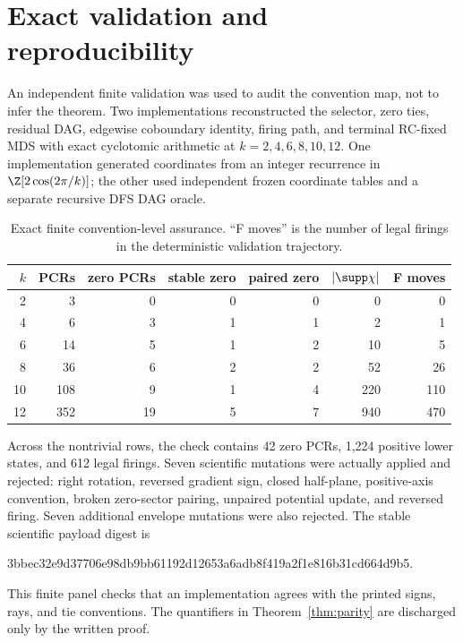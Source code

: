 \section{Exact validation and reproducibility}
\label{sec:validation}

An independent finite validation was used to audit the convention map, not
to infer the theorem.  Two implementations reconstructed the selector,
zero ties, residual DAG, edgewise coboundary identity, firing path, and
terminal RC-fixed MDS with exact cyclotomic arithmetic at
$k=2,4,6,8,10,12$.  One implementation generated coordinates from an
integer recurrence in $\Z[2\cos(2\pi/k)]$; the other used independent frozen
coordinate tables and a separate recursive DFS DAG oracle.

\begin{table}[ht]
\centering
\caption{Exact finite convention-level assurance.  ``F moves'' is the
number of legal firings in the deterministic validation trajectory.}
\label{tab:validation}
\begin{tabular}{rrrrrrr}
\toprule
$k$ & PCRs & zero PCRs & stable zero & paired zero & $|\supp\chi|$ & F moves\\
\midrule
2  & 3   & 0  & 0 & 0 & 0   & 0\\
4  & 6   & 3  & 1 & 1 & 2   & 1\\
6  & 14  & 5  & 1 & 2 & 10  & 5\\
8  & 36  & 6  & 2 & 2 & 52  & 26\\
10 & 108 & 9  & 1 & 4 & 220 & 110\\
12 & 352 & 19 & 5 & 7 & 940 & 470\\
\bottomrule
\end{tabular}
\end{table}

Across the nontrivial rows, the check contains 42 zero PCRs, 1,224 positive
lower states, and 612 legal firings.  Seven scientific mutations were
actually applied and rejected: right rotation, reversed gradient sign,
closed half-plane, positive-axis convention, broken zero-sector pairing,
unpaired potential update, and reversed firing.  Seven additional envelope
mutations were also rejected.  The stable scientific payload digest is
\begin{center}
\small\ttfamily
3bbec32e9d37706e98db9bb61192d12653a6adb8f419a2f1e816b31cd664d9b5.
\end{center}

This finite panel checks that an implementation agrees with the printed
signs, rays, and tie conventions.  The quantifiers in
Theorem~\ref{thm:parity} are discharged only by the written proof.
